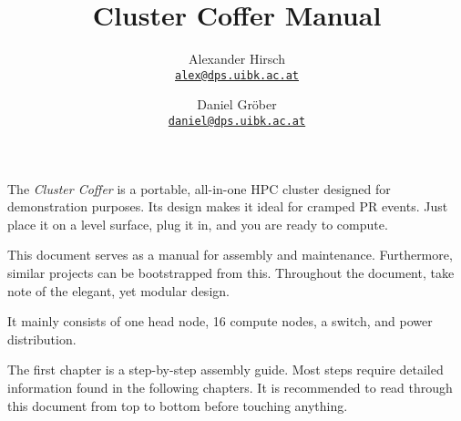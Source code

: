 \documentclass[a4paper,notitlepage,parskip=full]{scrreprt}
\title{Cluster Coffer Manual}
\author{
	Alexander Hirsch\\
	\href{mailto:alex@dps.uibk.ac.at}{\texttt{alex@dps.uibk.ac.at}}
	\and
	Daniel Gröber\\
	\href{mailto:daniel@dps.uibk.ac.at}{\texttt{daniel@dps.uibk.ac.at}}
}
\date{}
\begin{document}
\maketitle

The \textit{Cluster Coffer} is a portable, all-in-one HPC cluster designed for demonstration purposes.
Its design makes it ideal for cramped PR events.
Just place it on a level surface, plug it in, and you are ready to compute.

This document serves as a manual for assembly and maintenance.
Furthermore, similar projects can be bootstrapped from this.
Throughout the document, take note of the elegant, yet modular design.

It mainly consists of one head node, 16 compute nodes, a switch, and power distribution.

The first chapter is a step-by-step assembly guide.
Most steps require detailed information found in the following chapters.
It is recommended to read through this document from top to bottom before touching anything.

\tableofcontents







\appendix

\end{document}
